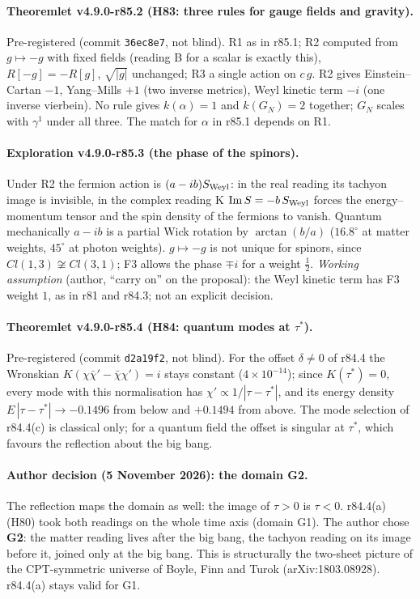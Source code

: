 \paragraph{Theoremlet v4.9.0-r85.2 (H83: three rules for gauge fields and gravity).}
Pre-registered (commit \texttt{36ec8e7}, not blind).  R1 as in r85.1; R2 computed from \(g\mapsto-g\) with fixed fields (reading B for a scalar
is exactly this), \(R[-g]=-R[g]\), \(\sqrt{|g|}\) unchanged; R3 a single action on \(c\,g\).  R2 gives Einstein--Cartan \(-1\), Yang--Mills \(+1\)
(two inverse metrics), Weyl kinetic term \(-i\) (one inverse vierbein).  No rule gives \(k(\alpha)=1\) and \(k(G_N)=2\) together; \(G_N\) scales
with \(\gamma^1\) under all three.  The match for \(\alpha\) in r85.1 depends on R1.

\paragraph{Exploration v4.9.0-r85.3 (the phase of the spinors).}
Under R2 the fermion action is \((a-ib)S_{\rm Weyl}\): in the real reading its tachyon image is invisible, in the complex reading K
\(\operatorname{Im}S=-b\,S_{\rm Weyl}\) forces the energy--momentum tensor and the spin density of the fermions to vanish.  Quantum mechanically
\(a-ib\) is a partial Wick rotation by \(\arctan(b/a)\) (\(16.8^\circ\) at matter weights, \(45^\circ\) at photon weights).  \(g\mapsto-g\) is not
unique for spinors, since \(Cl(1,3)\not\cong Cl(3,1)\); F3 allows the phase \(\mp i\) for a weight \(\tfrac12\).  \emph{Working assumption}
(author, ``carry on'' on the proposal): the Weyl kinetic term has F3 weight \(1\), as in r81 and r84.3; not an explicit decision.

\paragraph{Theoremlet v4.9.0-r85.4 (H84: quantum modes at \(\tau^*\)).}
Pre-registered (commit \texttt{d2a19f2}, not blind).  For the offset \(\delta\neq0\) of r84.4 the Wronskian \(K(\chi\bar\chi'-\bar\chi\chi')=i\) stays constant
(\(4\times10^{-14}\)); since \(K(\tau^*)=0\), every mode with this normalisation has \(\chi'\propto1/|\tau-\tau^*|\), and its energy density
\(E\,|\tau-\tau^*|\to-0.1496\) from below and \(+0.1494\) from above.  The mode selection of r84.4(c) is classical only; for a quantum field
the offset is singular at \(\tau^*\), which favours the reflection about the big bang.

\paragraph{Author decision (5 November 2026): the domain G2.}
The reflection maps the domain as well: the image of \(\tau>0\) is \(\tau<0\).  r84.4(a) (H80) took both readings on the whole time axis
(domain G1).  The author chose \textbf{G2}: the matter reading lives after the big bang, the tachyon reading on its image before it, joined
only at the big bang.  This is structurally the two-sheet picture of the CPT-symmetric universe of Boyle, Finn and Turok
(arXiv:1803.08928).  r84.4(a) stays valid for G1.

